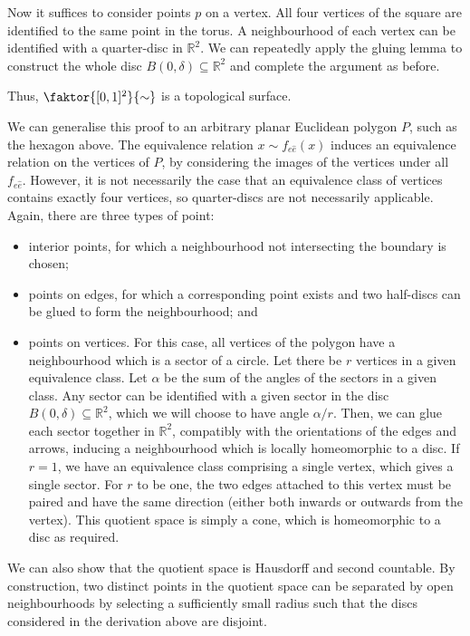 \begin{example}
\begin{example}
		Now it suffices to consider points \( p \) on a vertex.
		All four vertices of the square are identified to the same point in the torus.
		A neighbourhood of each vertex can be identified with a quarter-disc in \( \mathbb R^2 \).
		We can repeatedly apply the gluing lemma to construct the whole disc \( B(0,\delta) \subseteq \mathbb R^2 \) and complete the argument as before.

		Thus, \( \faktor{[0,1]^2}{\sim} \) is a topological surface.
	\end{example}
	We can generalise this proof to an arbitrary planar Euclidean polygon \( P \), such as the hexagon above.
	The equivalence relation \( x \sim f_{e \hat e}(x) \) induces an equivalence relation on the vertices of \( P \), by considering the images of the vertices under all \( f_{e\hat e} \).
	However, it is not necessarily the case that an equivalence class of vertices contains exactly four vertices, so quarter-discs are not necessarily applicable.
	Again, there are three types of point:
	\begin{itemize}
		\item interior points, for which a neighbourhood not intersecting the boundary is chosen;
		\item points on edges, for which a corresponding point exists and two half-discs can be glued to form the neighbourhood; and
		\item points on vertices.
		      For this case, all vertices of the polygon have a neighbourhood which is a sector of a circle.
		      Let there be \( r \) vertices in a given equivalence class.
		      Let \( \alpha \) be the sum of the angles of the sectors in a given class.
		      Any sector can be identified with a given sector in the disc \( B(0,\delta) \subseteq \mathbb R^2 \), which we will choose to have angle \( \alpha / r \).
		      Then, we can glue each sector together in \( \mathbb R^2 \), compatibly with the orientations of the edges and arrows, inducing a neighbourhood which is locally homeomorphic to a disc.
		      If \( r = 1 \), we have an equivalence class comprising a single vertex, which gives a single sector.
		      For \( r \) to be one, the two edges attached to this vertex must be paired and have the same direction (either both inwards or outwards from the vertex).
		      This quotient space is simply a cone, which is homeomorphic to a disc as required.
	\end{itemize}
	We can also show that the quotient space is Hausdorff and second countable.
	By construction, two distinct points in the quotient space can be separated by open neighbourhoods by selecting a sufficiently small radius such that the discs considered in the derivation above are disjoint.

\end{example}
